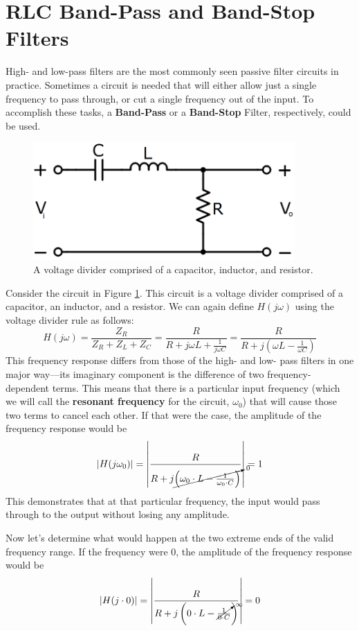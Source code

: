 \section{RLC Band-Pass and Band-Stop Filters}
High- and low-pass filters are the most commonly seen passive filter circuits in practice. Sometimes a circuit is needed that will either allow just a single frequency to pass through, or cut a single frequency out of the input. To accomplish these tasks, a \textbf{Band-Pass} or a \textbf{Band-Stop} Filter, respectively, could be used.
\begin{figure}[h!]
\centering
\includegraphics[width=10cm]{figures/BPfilter.png}
\caption{A voltage divider comprised of a capacitor, inductor, and resistor.}
\label{RLC_BP}
\end{figure}
\par
Consider the circuit in Figure \ref{RLC_BP}. This circuit is a voltage divider comprised of a capacitor, an inductor, and a resistor. We can again define $H(j\omega)$ using the voltage divider rule as follows:
$$
H(j\omega) = \frac{Z_R}{Z_R+Z_L+Z_C} = \frac{R}{R + j\omega L+\frac{1}{j\omega C}} = \frac{R}{R + j\left(\omega L-\frac{1}{\omega C}\right)}
$$
This frequency response differs from those of the high- and low- pass filters in one major way---its imaginary component is the difference of two frequency-dependent terms. This means that there is a particular input frequency (which we will call the \textbf{resonant frequency} for the circuit, $\omega_0$) that will cause those two terms to cancel each other. If that were the case, the amplitude of the frequency response would be 
$$
\left|H(j\omega_0)\right|=\left|\frac{R}{R + j\cancelto{0}{\left(\omega_0\cdot L-\frac{1}{\omega_0\cdot C}\right)}}\right| = 1
$$
This demonstrates that at that particular frequency, the input would pass through to the output without losing any amplitude. 
\par
Now let's determine what would happen at the two extreme ends of the valid frequency range. If the frequency were 0, the amplitude of the frequency response would be
$$
\left|H(j\cdot0)\right|=\left|\frac{R}{R + j\left(0\cdot L-\cancelto{\infty}{\frac{1}{0\cdot C}}\right)}\right| = 0 
$$
